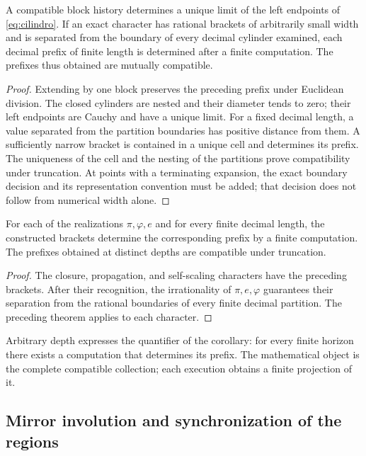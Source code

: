 \begin{theorem}
A compatible block history determines a unique limit of the left endpoints of \eqref{eq:cilindro}. If an exact character has rational brackets of arbitrarily small width and is separated from the boundary of every decimal cylinder examined, each decimal prefix of finite length is determined after a finite computation. The prefixes thus obtained are mutually compatible.
\end{theorem}
\begin{proof}
Extending by one block preserves the preceding prefix under Euclidean division. The closed cylinders are nested and their diameter tends to zero; their left endpoints are Cauchy and have a unique limit. For a fixed decimal length, a value separated from the partition boundaries has positive distance from them. A sufficiently narrow bracket is contained in a unique cell and determines its prefix. The uniqueness of the cell and the nesting of the partitions prove compatibility under truncation. At points with a terminating expansion, the exact boundary decision and its representation convention must be added; that decision does not follow from numerical width alone.
\end{proof}

\begin{corollary}
\label{gen:prefijos-regionales}
For each of the realizations \(\pi,\varphi,e\) and for every finite decimal
length, the constructed brackets determine the corresponding prefix by a
finite computation. The prefixes obtained at distinct depths are compatible
under truncation.
\end{corollary}
\begin{proof}
The closure, propagation, and self-scaling characters have the preceding
brackets. After their recognition, the irrationality of \(\pi,e,\varphi\)
guarantees their separation from the rational boundaries of every finite
decimal partition. The preceding theorem applies to each character.
\end{proof}
Arbitrary depth expresses the quantifier of the corollary: for every finite
horizon there exists a computation that determines its prefix. The
mathematical object is the complete compatible collection; each execution obtains
a finite projection of it.

\subsection{Mirror involution and synchronization of the regions}

